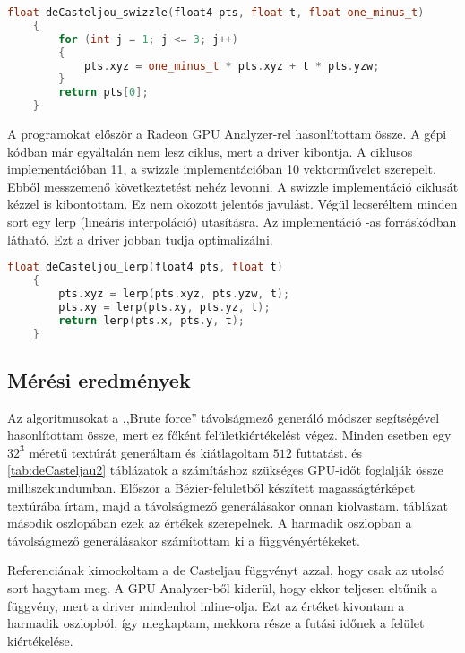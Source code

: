 \begin{lstlisting}[caption={de Casteljau swizzle operátorokkal}, language={C++}, label={lst:swizzle}]
	float deCasteljou_swizzle(float4 pts, float t, float one_minus_t)
	{
		for (int j = 1; j <= 3; j++)
		{
			pts.xyz = one_minus_t * pts.xyz + t * pts.yzw;
		}
		return pts[0];
	}
\end{lstlisting}

A programokat először a Radeon GPU Analyzer-rel hasonlítottam össze. A gépi kódban már egyáltalán nem lesz ciklus, mert a driver kibontja. A ciklusos implementációban 11, a swizzle implementációban 10 vektorművelet szerepelt. Ebből messzemenő következtetést nehéz levonni. A swizzle implementáció ciklusát kézzel is kibontottam. Ez nem okozott jelentős javulást. Végül lecseréltem minden sort egy lerp (lineáris interpoláció) utasításra. Az implementáció -as forráskódban látható. Ezt a driver jobban tudja optimalizálni. 

\lstset{}
\begin{lstlisting}[caption={de Casteljau lerp függvénnyel}, language={C++}, label={lst:lerp}]
	float deCasteljou_lerp(float4 pts, float t)
	{
		pts.xyz = lerp(pts.xyz, pts.yzw, t);
		pts.xy = lerp(pts.xy, pts.yz, t);
		return lerp(pts.x, pts.y, t);
	}
\end{lstlisting}


\subsection{Mérési eredmények}
Az algoritmusokat a ,,Brute force'' távolságmező generáló módszer segítségével hasonlítottam össze, mert ez főként felületkiértékelést végez. Minden esetben egy $32^3$ méretű textúrát generáltam és kiátlagoltam $512$ futtatást.  és \ref{tab:deCasteljau2} táblázatok a számításhoz szükséges GPU-időt foglalják össze milliszekundumban. Először a Bézier-felületből készített magasságtérképet textúrába írtam, majd a távolságmező generálásakor onnan kiolvastam.  táblázat második oszlopában ezek az értékek szerepelnek. A harmadik oszlopban a távolságmező generálásakor számítottam ki a függvényértékeket.

Referenciának kimockoltam a de Casteljau függvényt azzal, hogy csak az utolsó sort hagytam meg. A GPU Analyzer-ből kiderül, hogy ekkor teljesen eltűnik a függvény, mert a driver mindenhol inline-olja. Ezt az értéket kivontam a harmadik oszlopból, így megkaptam, mekkora része a futási időnek a felület kiértékelése.

